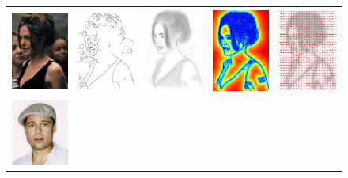 \begin{figure}
\begin{tabular}{ccccc}
\includegraphics[width=1in]{figures/imagetable/image_aj.png} &
\includegraphics[width=1in]{figures/imagetable/edges_aj.png} &
\includegraphics[width=1in]    {figures/imagetable/avg_aj.png} &
\includegraphics[width=1in]   {figures/imagetable/mag_aj.png} &
\includegraphics[width=1in]     {figures/imagetable/dir_aj.png} \\
\includegraphics[width=1in]{figures/imagetable/image_bp.png} &

\end{tabular}
\end{figure}
